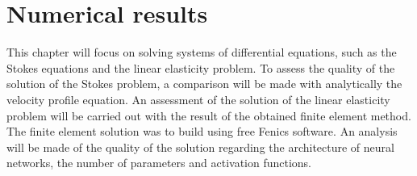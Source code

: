 \chapter{Numerical results}

This chapter will focus on solving systems of differential equations, such as the Stokes equations and the linear elasticity problem. To assess the quality of the solution of the Stokes problem, a comparison will be made with analytically the velocity profile equation. An assessment of the solution of the linear elasticity problem will be carried out with the result of the obtained finite element method. The finite element solution was to build using free Fenics software. An analysis will be made of the quality of the solution regarding the architecture of neural networks, the number of parameters and activation functions.

